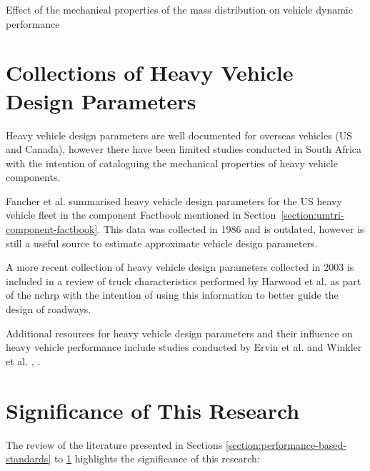 \begin{table}[H]
\begin{threeparttable}
		\caption{Effect of the mechanical properties of the mass distribution on vehicle dynamic performance}
		\label{table:effect-of-the-mechanical-properties-of-mass-distribution-on-vehicle-dynamic-performance}

	\end{threeparttable}
\end{table}

\section{Collections of Heavy Vehicle Design Parameters}\label{section:collections-of-heavy-vehicle-design-parameters}
Heavy vehicle design parameters are well documented for overseas vehicles (US and Canada), however there have been limited studies conducted in South Africa with the intention of cataloguing the mechanical properties of heavy vehicle components.

Fancher et al. \cite{Fancher1986} summarised heavy vehicle design parameters for the US heavy vehicle fleet in the component Factbook mentioned in Section~\ref{section:umtri-component-factbook}. This data was collected in 1986 and is outdated, however is still a useful source to estimate approximate vehicle design parameters.

A more recent collection of heavy vehicle design parameters collected in 2003 is included in a review of truck characteristics performed by Harwood et al. \cite{Harwood2003} as part of the \gls{nchrp} with the intention of using this information to better guide the design of roadways.

Additional resources for heavy vehicle design parameters and their influence on heavy vehicle performance include studies conducted by Ervin et al. \cite{Ervin1986} and Winkler et al. \cite{Winkler1995}, \cite{Winkler2011}.

\section{Significance of This Research}\label{section:significance-of-this-research}
The review of the literature presented in Sections \ref{section:performance-based-standards} to \ref{section:collections-of-heavy-vehicle-design-parameters} highlights the significance of this research:

